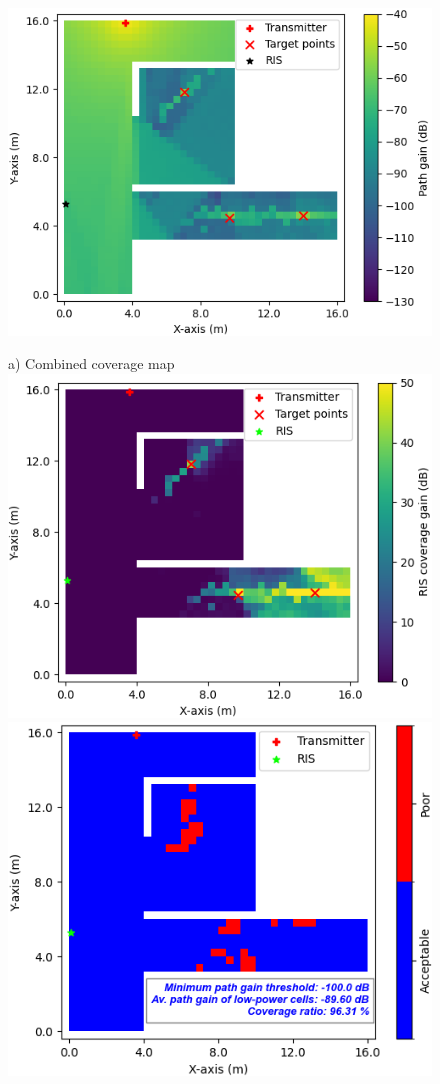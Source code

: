 \documentclass{IEEEoj}
\begin{document}
\begin{figure}
	\centering
	\includegraphics[width=0.8\linewidth]{Sim_Results/Comb_cov_1x2_Distance.png}
	
	a) Combined coverage map \\[5pt]
	
	\includegraphics[width=0.49\linewidth]{Sim_Results/RIS_cov_gain_1x2_Distance.png}
	\hfill
	\includegraphics[width=0.48\linewidth]{Sim_Results/New_Binary_Cov_Map_1x2_Distance.png}
	

\end{figure}
\end{document}
